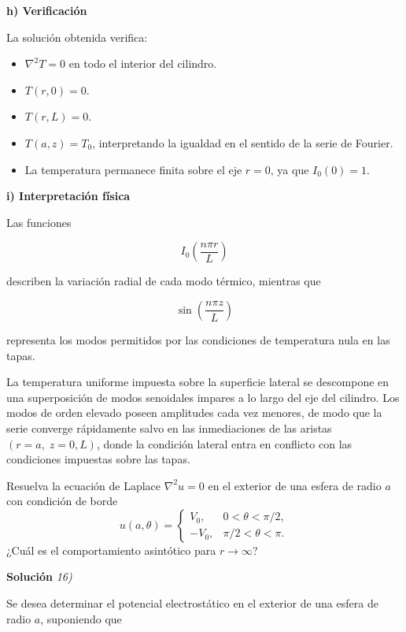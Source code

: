\documentclass[11pt,spanish]{article}
\newcounter{problema}
\newcommand{\prob}{\stepcounter{problema} \vspace{.5cm} \noindent{\bf Problema \arabic{problema}: }}
\begin{document}
{\bf h) Verificación}

La solución obtenida verifica:

\begin{itemize}
\item \(\nabla^2T=0\) en todo el interior del cilindro.
\item \(T(r,0)=0\).
\item \(T(r,L)=0\).
\item \(T(a,z)=T_0\), interpretando la igualdad en el sentido de la serie de Fourier.
\item La temperatura permanece finita sobre el eje \(r=0\), ya que \(I_0(0)=1\).
\end{itemize}


{\bf i) Interpretación física}

Las funciones

\[
I_0\!\left(\frac{n\pi r}{L}\right)
\]

describen la variación radial de cada modo térmico, mientras que

\[
\sin\!\left(\frac{n\pi z}{L}\right)
\]

representa los modos permitidos por las condiciones de temperatura nula en las
tapas.

La temperatura uniforme impuesta sobre la superficie lateral se descompone en
una superposición de modos senoidales impares a lo largo del eje del cilindro.
Los modos de orden elevado poseen amplitudes cada vez menores, de modo que la
serie converge rápidamente salvo en las inmediaciones de las aristas
\((r=a,\;z=0,L)\), donde la condición lateral entra en conflicto con las
condiciones impuestas sobre las tapas.






\prob Resuelva la ecuación de Laplace \(\nabla^2 u = 0\) en el exterior de una esfera de radio \(a\) con condición de borde
\[
u(a,\theta) = \begin{cases}
V_0, & 0<\theta<\pi/2,\\
-V_0, & \pi/2<\theta<\pi.
\end{cases}
\]
¿Cuál es el comportamiento asintótico para \(r\to\infty\)?

\vspace{0.5cm}
{\bf Soluci\'on }{\em 16)}
\vspace{0.5cm}

Se desea determinar el potencial electrostático en el exterior de una esfera de
radio \(a\), suponiendo que
\end{document}
